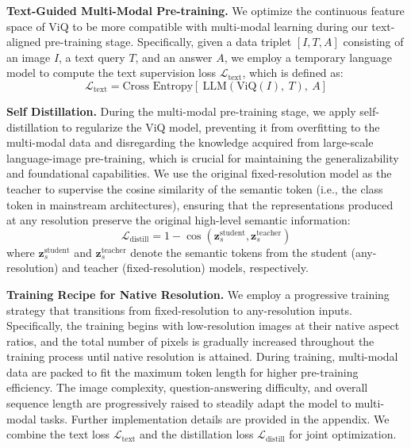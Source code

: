 \documentclass{llmxive}
\providecommand{\paragrapha}[1]{\par\addvspace{0.45em}\noindent\textbf{#1}}
\begin{document}
\paragrapha{Text-Guided Multi-Modal Pre-training. }We optimize the continuous feature space of ViQ to be more compatible with multi-modal learning during our text-aligned pre-training stage. Specifically, given a data triplet $[I, T, A]$ consisting of an image $I$, a text query $T$, and an answer $A$, we employ a temporary language model to compute the text supervision loss $\mathcal{L}_{\text{text}}$, which is defined as:
\begin{equation}
    \mathcal{L}_{\text{text}}=\text{Cross Entropy}[\ \text{LLM}(\text{ViQ}(I),\ T),\ A]
\end{equation}

\paragrapha{Self Distillation. }During the multi-modal pre-training stage, we apply self-distillation to regularize the ViQ model, preventing it from overfitting to the multi-modal data and disregarding the knowledge acquired from large-scale language-image pre-training, which is crucial for maintaining the generalizability and foundational capabilities. We use the original fixed-resolution model as the teacher to supervise the cosine similarity of the semantic token (i.e., the class token in mainstream architectures), ensuring that the representations produced at any resolution preserve the original high-level semantic information:
\begin{equation}
    \mathcal{L}_{\text{distill}} = 1 - \cos\left(\mathbf{z}_s^{\text{student}}, \mathbf{z}_s^{\text{teacher}}\right)
\end{equation}
where \(\mathbf{z}_s^{\text{student}}\) and \(\mathbf{z}_s^{\text{teacher}}\) denote the semantic tokens from the student (any-resolution) and teacher (fixed-resolution) models, respectively.

\paragrapha{Training Recipe for Native Resolution. }We employ a progressive training strategy that transitions from fixed-resolution to any-resolution inputs. Specifically, the training begins with low-resolution images at their native aspect ratios, and the total number of pixels is gradually increased throughout the training process until native resolution is attained. During training, multi-modal data are packed to fit the maximum token length for higher pre-training efficiency. The image complexity, question-answering difficulty, and overall sequence length are progressively raised to steadily adapt the model to multi-modal tasks. Further implementation details are provided in the appendix. We combine the text loss \(\mathcal{L}_{\text{text}}\) and the distillation loss \(\mathcal{L}_{\text{distill}}\) for joint optimization.
\end{document}

